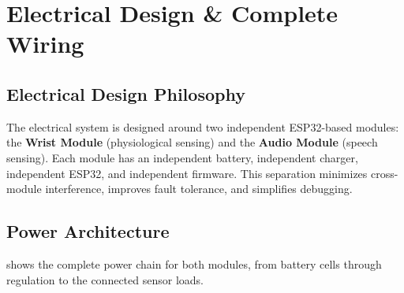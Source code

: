\section{Electrical Design \& Complete Wiring}
\label{sec:electrical-design}

\subsection{Electrical Design Philosophy}
\label{sec:electrical-design-philosophy}

The electrical system is designed around two independent ESP32-based modules: the \textbf{Wrist Module} (physiological sensing) and the \textbf{Audio Module} (speech sensing). Each module has an independent battery, independent charger, independent ESP32, and independent firmware. This separation minimizes cross-module interference, improves fault tolerance, and simplifies debugging.

\subsection{Power Architecture}
\label{sec:power-architecture-ch5}

 shows the complete power chain for both modules, from battery cells through regulation to the connected sensor loads.

